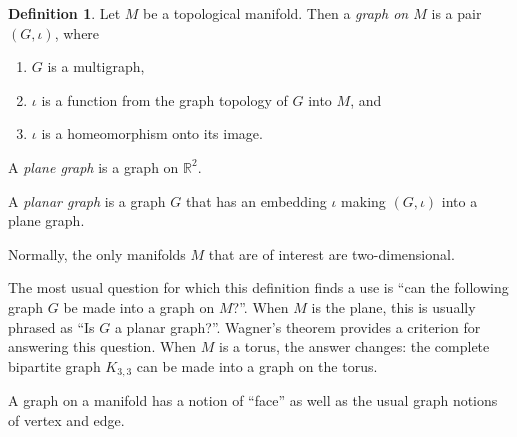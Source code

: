\documentclass[12pt]{article}
\theoremstyle{definition}
\newtheorem*{defn}{Definition}
\begin{document}
\begin{defn}
Let $M$ be a topological manifold.  Then a \emph{graph on $M$} is a pair $(G,\iota)$, where 
\begin{enumerate}
\item $G$ is a multigraph, 
\item $\iota$ is a function from the graph topology of $G$ into $M$, and
\item $\iota$ is a homeomorphism onto its image.
\end{enumerate}
A \emph{plane graph} is a graph on $\mathbb{R}^2$. 

A \emph{planar graph} is a graph $G$ that has an embedding $\iota$ making $(G,\iota)$ into a plane graph.
\end{defn}

Normally, the only manifolds $M$ that are of interest are two-dimensional.  

The most usual question for which this definition finds a use is ``can the following graph $G$ be made into a graph on $M$?''.  When $M$ is the plane, this is usually phrased as ``Is $G$ a planar graph?''.  Wagner's theorem provides a  criterion for answering this question.  When $M$ is a torus, the answer changes: the complete bipartite graph $K_{3,3}$ can be made into a graph on the torus. 

A graph on a manifold has a notion of ``face'' as well as the usual graph notions of vertex and edge.
\end{document}
